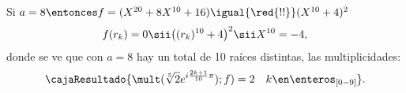 \bigskip

Si $a = 8 \entonces f = (X^{20} + 8X^{10} + 16) \igual{\red{!!}} (X^{10} + 4)^2$
$$
	f(r_k) = 0
	\sii
	\big((r_k)^{10} + 4\big)^2
	\sii
	X^{10} = -4,
$$
donde se ve que con $a = 8$ hay un total de 10 raíces distintas, las multiplicidades:
$$
	\cajaResultado{\mult(\sqrt[5]{2}e^{i\frac{2k+1}{10}\pi});f) = 2 \quad k \en \enteros_{[0-9]}}.
$$

\begin{aportes}
	\item {}
\end{aportes}
